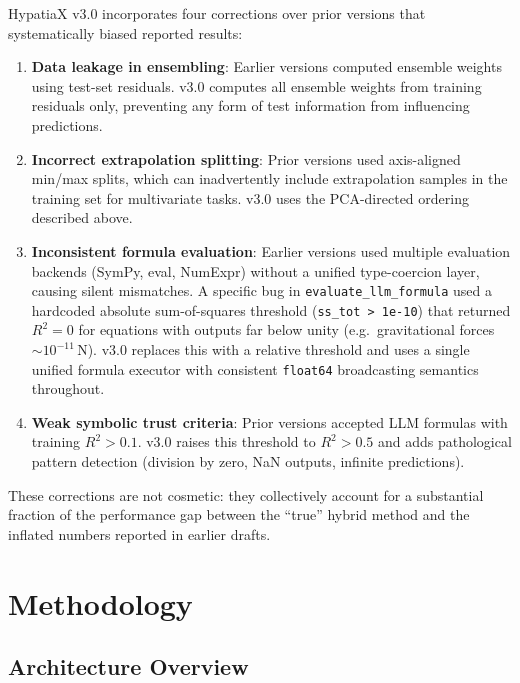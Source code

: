 \documentclass[twoside,11pt]{article}
\newcommand{\Rsq}{R^{2}}
\begin{document}
HypatiaX v3.0 incorporates four corrections over prior versions that systematically
biased reported results:

\begin{enumerate}[leftmargin=2em,label=\arabic*.]
  \item \textbf{Data leakage in ensembling}: Earlier versions computed ensemble
    weights using test-set residuals.  v3.0 computes all ensemble weights from
    training residuals only, preventing any form of test information from
    influencing predictions.

  \item \textbf{Incorrect extrapolation splitting}: Prior versions used axis-aligned
    min/max splits, which can inadvertently include extrapolation samples in the
    training set for multivariate tasks.  v3.0 uses the PCA-directed ordering
    described above.

  \item \textbf{Inconsistent formula evaluation}: Earlier
    versions used multiple evaluation backends (SymPy, eval, NumExpr) without a
    unified type-coercion layer, causing silent mismatches.  A specific bug in
    \texttt{evaluate\_llm\_formula} used a hardcoded absolute sum-of-squares
    threshold (\texttt{ss\_tot > 1e-10}) that returned $\Rsq = 0$ for equations
    with outputs far below unity (e.g.\ gravitational forces $\sim 10^{-11}$\,N).
    v3.0 replaces this with a relative threshold and uses a single unified formula
    executor with consistent \texttt{float64} broadcasting semantics throughout.

  \item \textbf{Weak symbolic trust criteria}: Prior versions accepted LLM formulas
    with training $\Rsq > 0.1$.  v3.0 raises this threshold to $\Rsq > 0.5$ and
    adds pathological pattern detection (division by zero, NaN outputs, infinite
    predictions).
\end{enumerate}

These corrections are not cosmetic: they collectively account for a substantial
fraction of the performance gap between the ``true'' hybrid method and the inflated
numbers reported in earlier drafts.

\section{Methodology}
\label{sec:method}

\subsection{Architecture Overview}
\label{sec:method_overview}
\end{document}
